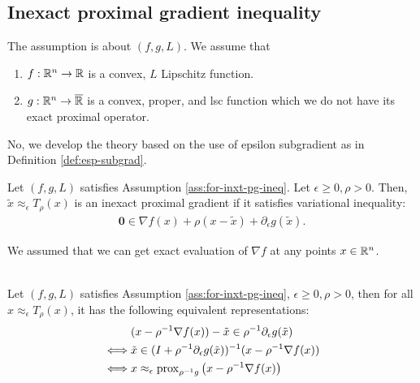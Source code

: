 \documentclass[12pt]{article}
\begin{document}
    \subsection{Inexact proximal gradient inequality}
        \begin{assumption}\label{ass:for-inxt-pg-ineq}
            The assumption is about $(f, g, L)$. 
            We assume that 
            \begin{enumerate}[nosep]
                \item $f: \mathbb R^n \rightarrow \mathbb R$ is a convex, $L$ Lipschitz function. 
                \item $g: \mathbb R^n \rightarrow \overline{\mathbb R}$ is a convex, proper, and lsc function which we do not have its exact proximal operator. 
            \end{enumerate}
        \end{assumption}
        No, we develop the theory based on the use of epsilon subgradient as in Definition \ref{def:esp-subgrad}. 
        \begin{definition}\label{def:inxt-pg}
            Let $(f, g, L)$ satisfies Assumption \ref{ass:for-inxt-pg-ineq}. 
            Let $\epsilon \ge 0, \rho > 0$. 
            Then, $\tilde x \approx_\epsilon T_\rho(x)$ is an inexact proximal gradient if it satisfies variational inequality: 
            \begin{align*}
                \mathbf 0 \in \nabla f(x) + \rho(x - \tilde x) + \partial_{\epsilon} g(\tilde x). 
            \end{align*}
        \end{definition}
        \begin{remark}
            We assumed that we can get exact evaluation of $\nabla f$ at any points $x \in \mathbb R^n$. 
        \end{remark}
        \begin{lemma}\;\label{lemma:other-repr-inxt-pg}\\
            Let $(f, g, L)$ satisfies Assumption \ref{ass:for-inxt-pg-ineq}, $\epsilon \ge 0, \rho > 0$, then for all $x \approx_\epsilon T_\rho(x)$, it has the following equivalent representations: 
            \begin{align*}
                & (x - \rho^{-1}\nabla f(x)) - \tilde x 
                \in \rho^{-1} \partial_\epsilon g(\tilde x)
                \\
                \iff 
                & \tilde x \in (I + \rho^{-1}\partial_\epsilon g(\tilde x))^{-1}
                (x - \rho^{-1}\nabla f(x))
                \\
                \iff 
                & x \approx_\epsilon \operatorname{prox}_{\rho^{-1} g}
                \left(x - \rho^{-1}\nabla f(x)\right)
            \end{align*}
        \end{lemma}
\end{document}
